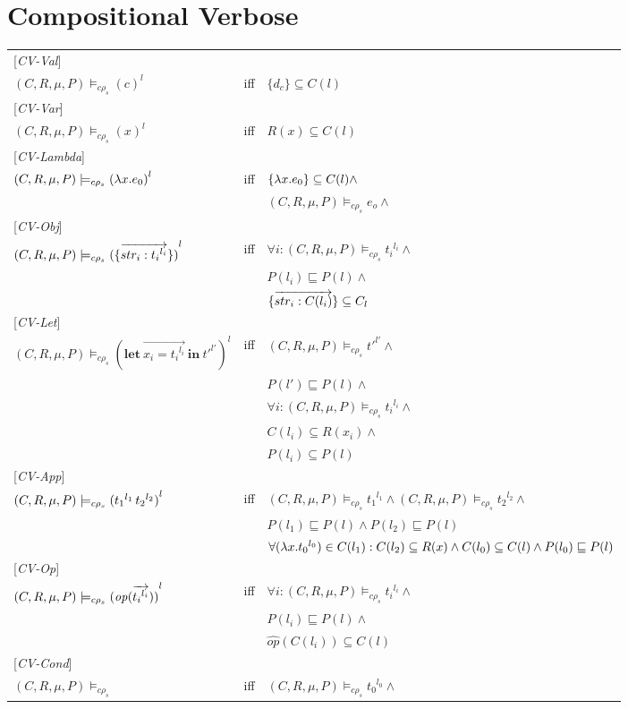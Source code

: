 \documentclass[[12pt,a4paper,twoside,openrigh]{article}
\newcommand{\letexprs}[3]{\mathbf{let}\ \vec{#1 = #2}\ \mathbf{in}\ #3}
\newcommand{\envs}{(C,R,\mu, P)}
\newcommand{\ccest}[1]{\envs \models_{c \rho_s} #1}
\newcommand{\ccestl}[1]{\envs \models_{c \rho_s} {(#1)}^{l}}
\newcommand{\lbt}[1]{{t_#1}^{l_#1}}
\begin{document}
\section{Compositional Verbose}
\begin{tabular}{l l l}
{[\textit{CV-Val}]} \\
$ \ccestl {c} $ & iff & $\{d_c\} \subseteq C(l)$ \\ 
{[\textit{CV-Var}]} \\
$ \ccestl {x} $ & iff & $R(x) \subseteq C(l)$ \\ 
{[\textit{CV-Lambda}]} \\
$ \ccestl {\lam{x}{e_0}} $ & iff & $\{\lambda x.e_0\} \subseteq C(l) \wedge $\\
&& $ \ccest {e_o} \wedge$ \\
{[\textit{CV-Obj}]} \\
$ \ccestl {\rec{\vec{str_i : {t_i}^{l_i}}}}$ & iff & $\forall i: \ccest {{t_i}^{l_i}} \wedge$\\
&& $ P(l_i) \sqsubseteq P(l) \wedge$\\ 
&& $\{\overrightarrow{str_i : C(l_i)}\} \subseteq C_l $ \\
{[\textit{CV-Let}]} \\
$ \ccestl {\letexprs{x_i}{{t_i}^{l_i}}{{t'}^{l'}}}$ & iff & $ \ccest {{t'}^{l'}} \wedge$ \\
&& $ P(l') \sqsubseteq P(l) \wedge$\\
&& $ \forall i: \ccest {{t_i}^{l_i}} \wedge$ \\
&& $ C(l_i) \subseteq R(x_i) \wedge$ \\
&& $ P(l_i) \subseteq P(l) $ \\
{[\textit{CV-App}]} \\
$ \ccestl {\appl {\lbt 1} {\lbt 2}}$ & iff & $ \ccest {\lbt 1} \wedge \ccest {\lbt 2} \wedge$ \\
&& $P(l_1) \sqsubseteq P(l) \wedge P(l_2) \sqsubseteq P(l)$ \\
&& $\forall (\lam{x}{\lbt 0}) \in C(l_1) : C(l_2) \subseteq R(x) \wedge C(l_0) \subseteq C(l) \wedge P(l_0) \sqsubseteq P(l) $\\
{[\textit{CV-Op}]} \\
$ \ccestl {\op (\vec{\lbt i})} $& iff &$\forall i : \ccest {\lbt i} \wedge $\\
&& $P(l_i) \sqsubseteq P(l) \wedge$\\
&& $\widehat{op} (C(l_i)) \subseteq C(l) $\\
{[\textit{CV-Cond}]}\\
$\envs \models_{c \rho_s} $& iff &$ \ccest {\lbt 0} \wedge $\\

\end{tabular}
\end{document}
